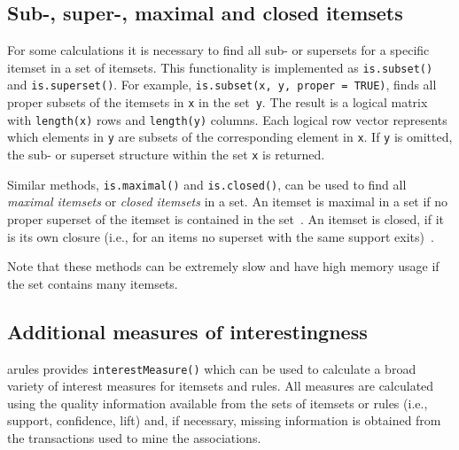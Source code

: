 \documentclass[10pt,a4paper]{article}
\newcommand{\strong}[1]{{\normalfont\fontseries{b}\selectfont #1}}
\newcommand{\func}[1]{\mbox{\texttt{#1()}}}
\newcommand{\code}[1]{\mbox{\texttt{#1}}}
\newcommand{\pkg}[1]{\strong{#1}}
\begin{document}



\subsection{Sub-, super-, maximal and closed itemsets}
For some calculations it is necessary to find all sub- or supersets 
for a specific itemset
in a set of itemsets. This functionality is implemented as 
\func{is.subset} and \func{is.superset}. 
For example, \code{is.subset(x, y, proper = TRUE)}, finds all
proper subsets of the itemsets in \code{x} in the set~\code{y}. 
The result is a logical matrix with \code{length(x)} 
rows and \code{length(y)} columns.  Each logical row vector represents 
which elements in \code{y} are subsets of the corresponding element in 
\code{x}. If \code{y} is omitted, the sub- or superset structure within the
set \code{x} is returned.

Similar methods, \func{is.maximal} and \func{is.closed}, can be used to find all
\emph{maximal itemsets} or \emph{closed itemsets} in a set.  An itemset is
maximal in a set if no proper superset of the itemset is contained in the
set~\citep{arules:Zaki+Parthasarathy+Ogihara+Li:1997}.  An itemset is closed,
if it is its own closure (i.e., for an items no superset with the same support
exits)~\citep{arules:Pasquier+Bastide+Taouil+Lakhal:1999}.


Note that these methods can be extremely slow and have high memory 
usage if the set contains many itemsets. 

\subsection{Additional measures of interestingness}
\pkg{arules} provides 
\func{interestMeasure}
which can be used to calculate
a broad variety of interest measures for itemsets and rules. 
All measures are calculated
using the quality information available from the
sets of itemsets or rules (i.e., support, confidence, lift) and,
if necessary, missing information is obtained from the
transactions used to mine the associations.
\end{document}
